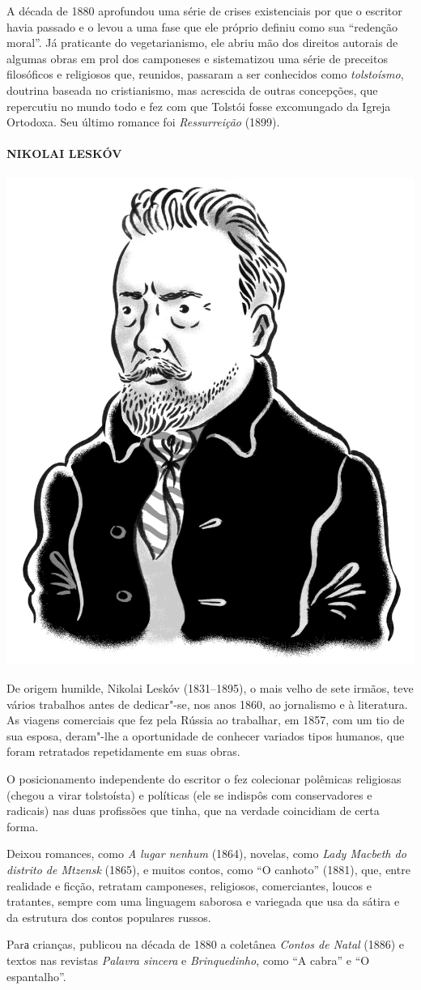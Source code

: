 {A década de 1880 aprofundou uma série de crises existenciais por que o
escritor havia passado e o levou a uma fase que ele próprio definiu como
sua ``redenção moral''. Já praticante do vegetarianismo, ele abriu mão
dos direitos autorais de algumas obras em prol dos camponeses e
sistematizou uma série de preceitos filosóficos e religiosos que,
reunidos, passaram a ser conhecidos como \emph{tolstoísmo}, doutrina
baseada no cristianismo, mas acrescida de outras concepções, que
repercutiu no mundo todo e fez com que Tolstói fosse excomungado da
Igreja Ortodoxa. Seu último romance foi \emph{Ressurreição} (1899).

\paragraph{NIKOLAI LESKÓV}

\noindent\includegraphics[width=.8in]{./imgs/autor5.jpg}

\noindent{}De origem humilde, Nikolai Leskóv (1831--1895), o mais velho de sete
irmãos, teve vários trabalhos antes de dedicar"-se, nos anos 1860, ao
jornalismo e à literatura. As viagens comerciais que fez pela Rússia ao
trabalhar, em 1857, com um tio de sua esposa, deram"-lhe a oportunidade
de conhecer variados tipos humanos, que foram retratados repetidamente
em suas obras.

O posicionamento independente do escritor o fez colecionar polêmicas
religiosas (chegou a virar tolstoísta) e políticas (ele se indispôs com
conservadores e radicais) nas duas profissões que tinha, que na verdade
coincidiam de certa forma.

Deixou romances, como \emph{A lugar nenhum} (1864), novelas, como
\emph{Lady Macbeth do distrito de Mtzensk} (1865), e muitos contos, como
``O canhoto'' (1881), que, entre realidade e ficção, retratam
camponeses, religiosos, comerciantes, loucos e tratantes, sempre com uma
linguagem saborosa e variegada que usa da sátira e da estrutura dos
contos populares russos.

Parа crianças, publicou na década de 1880 a coletânea \emph{Contos de
Natal} (1886) e textos nas revistas \emph{Palavra sincera} e
\emph{Brinquedinho}, como ``A cabra'' e ``O espantalho''.

}
